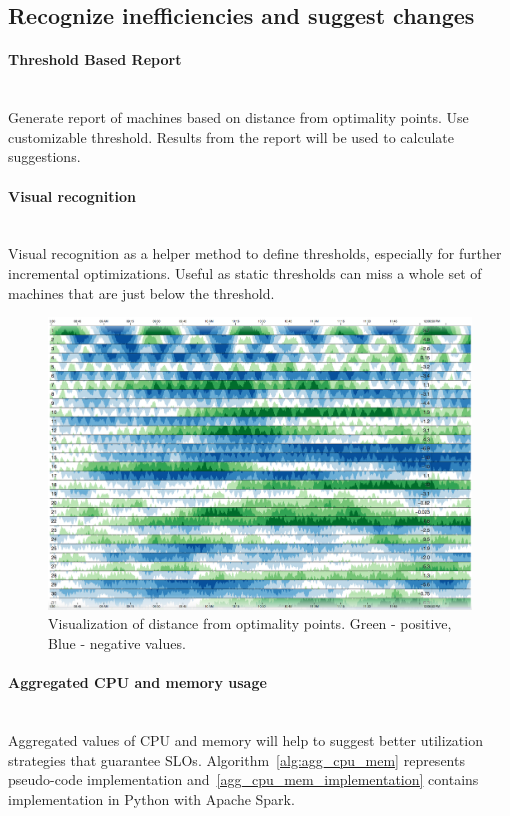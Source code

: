 \documentclass[]{final_report}
\newcommand{\myparagraph}[1]{\paragraph{#1}\mbox{}\\}
\begin{document}
\subsection{Recognize inefficiencies and suggest changes}

\myparagraph{Threshold Based Report}

Generate report of machines based on distance from optimality points. Use customizable threshold. 
Results from the report will be used to calculate suggestions.

\myparagraph{Visual recognition}

Visual recognition as a helper method to define thresholds, especially for further incremental optimizations. 
Useful as static thresholds can miss a whole set of machines that are just below the threshold. 

\begin{figure}[H]
       \includegraphics[width=\linewidth]{figures/cubism}
      \caption{Visualization of distance from optimality points. Green - positive, Blue - negative values.}
        \label{fig:cubism}
\end{figure}

\myparagraph{Aggregated CPU and memory usage}

Aggregated values of CPU and memory will help to suggest better utilization strategies that guarantee SLOs. Algorithm~\ref{alg:agg_cpu_mem} represents pseudo-code implementation and~\ref{agg_cpu_mem_implementation} contains implementation in Python with Apache Spark.
\end{document}
